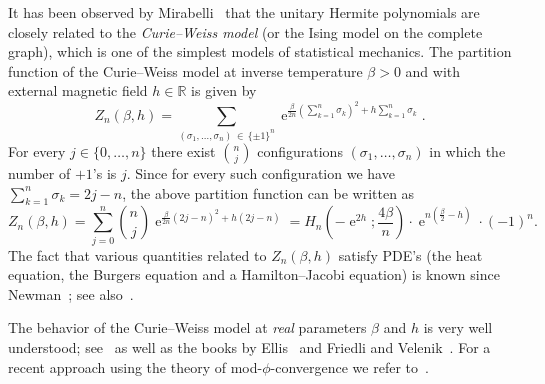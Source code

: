 \documentclass[AHL,Unicode,longabstracts,published]{cedram}
\DeclareMathOperator{\eee}{e}
\newcommand{\R}{\mathbb{R}}
\begin{document}
It has been observed by Mirabelli~\cite[Section~3.2.5]{mirabelli_diss} that the unitary Hermite polynomials are closely related to the \emph{Curie--Weiss model} (or the Ising model on the complete graph), which is one of the simplest models of statistical mechanics. The partition function of the Curie--Weiss model at inverse temperature $\beta>0$ and with external magnetic field $h\in \R$ is given by
\begin{equation}\label{eq:curie_weiss_part_funct_def}
Z_n(\beta, h) = \sum_{(\sigma_1,\ldots, \sigma_n)\,\in\,\{\pm 1\}^n} \eee^{\frac {\beta}{2n} \left(\sum\limits_{k=1}^n \sigma_k\right)^2 + h \sum\limits_{k=1}^n \sigma_k}.
\end{equation}
For every $j\in \{0,\ldots,n\}$ there exist $\binom nj$ configurations $(\sigma_1,\ldots, \sigma_n)$ in which the number of $+1$'s is $j$. Since for every such configuration we have $\sum_{k=1}^n \sigma_k = 2j - n$, the above partition function can be written as
\begin{equation}\label{eq:curie_weiss_part_funct_reduction_hermite}
Z_n(\beta, h) =
\sum_{j=0}^n \binom n j \eee^{\frac {\beta}{2n} (2j-n)^2 + h(2j - n)} = H_n \left(-\eee^{2h}; \frac {4\beta}{n}\right) \cdot \eee^{n(\frac \beta 2 - h)} \cdot (-1)^n.
\end{equation}
The fact that various quantities related to $Z_n(\beta, h)$ satisfy PDE's (the heat equation, the Burgers equation and a Hamilton--Jacobi equation) is known since Newman~\cite{newman_perc_theory}; see also~\cite{dominguez_mourrat,dascaliuc}.



The behavior of the Curie--Weiss model at \emph{real} parameters $\beta$ and $h$ is very well understood; see~\cite{ellis_newman,ellis_newman_stat_CW,ellis_newman_rosen} as well as the books by Ellis~\cite[Sections~IV.4, V.9]{ellis_book} and Friedli and Velenik~\cite[Chapter~2]{friedli_velenik_book}. For a recent approach using the theory of mod-$\phi$-convergence we refer to~\cite{meliot_nikeghbali_stat_mech}.
\end{document}
